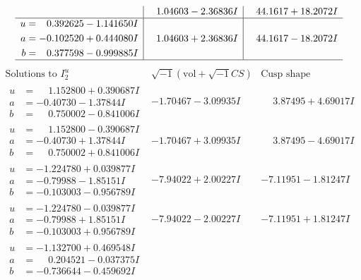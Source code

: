 \documentclass[1p]{elsarticle_modified}
\theoremstyle{definition}
\newcommand{\I}{\sqrt{-1}}
\begin{document}
$$\begin{array}{c|c|c}
 & \phantom{-}1.04603 - 2.36836 I & \phantom{-}44.1617 + 18.2072 I \\ \hline\begin{aligned}
u &= \phantom{-}0.392625 - 1.141650 I \\
a &= -0.102520 + 0.444080 I \\
b &= \phantom{-}0.377598 - 0.999885 I\end{aligned}
 & \phantom{-}1.04603 + 2.36836 I & \phantom{-}44.1617 - 18.2072 I\\
 \hline 
 \end{array}$$\newpage$$\begin{array}{c|c|c}  
\text{Solutions to }I^u_{2}& \I (\text{vol} + \sqrt{-1}CS) & \text{Cusp shape}\\
 \hline 
\begin{aligned}
u &= \phantom{-}1.152800 + 0.390687 I \\
a &= -0.40730 - 1.37844 I \\
b &= \phantom{-}0.750002 - 0.841006 I\end{aligned}
 & -1.70467 - 3.09935 I & \phantom{-}3.87495 + 4.69017 I \\ \hline\begin{aligned}
u &= \phantom{-}1.152800 - 0.390687 I \\
a &= -0.40730 + 1.37844 I \\
b &= \phantom{-}0.750002 + 0.841006 I\end{aligned}
 & -1.70467 + 3.09935 I & \phantom{-}3.87495 - 4.69017 I \\ \hline\begin{aligned}
u &= -1.224780 + 0.039877 I \\
a &= -0.79988 - 1.85151 I \\
b &= -0.103003 - 0.956789 I\end{aligned}
 & -7.94022 + 2.00227 I & -7.11951 - 1.81247 I \\ \hline\begin{aligned}
u &= -1.224780 - 0.039877 I \\
a &= -0.79988 + 1.85151 I \\
b &= -0.103003 + 0.956789 I\end{aligned}
 & -7.94022 - 2.00227 I & -7.11951 + 1.81247 I \\ \hline\begin{aligned}
u &= -1.132700 + 0.469548 I \\
a &= \phantom{-}0.204521 - 0.037375 I \\
b &= -0.736644 - 0.459692 I\end{aligned}

\end{array}$$
\end{document}
